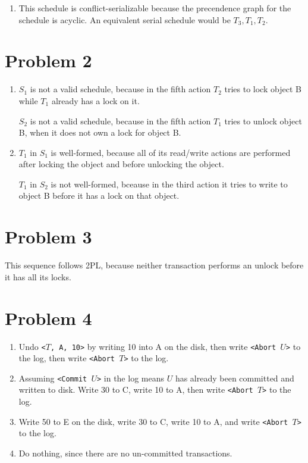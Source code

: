\documentclass[a4paper, 12pt]{article}
\begin{document}
\begin{enumerate}[label=\textbf{S\arabic*:}]
\begin{enumerate}[label=Q\arabic*:]
			\item This schedule is conflict-serializable because the precendence
				graph for the schedule is acyclic. An equivalent serial schedule
				would be $T_3, T_1, T_2$.
		\end{enumerate}
\end{enumerate}

\section*{Problem 2}

\begin{enumerate}[label=Q\arabic*:]
	\item $S_1$ is not a valid schedule, because in the fifth action $T_2$ tries
		to lock object B while $T_1$ already has a lock on it.

		$S_2$ is not a valid schedule, because in the fifth action $T_1$ tries
		to unlock object B, when it does not own a lock for object B.
	\item $T_1$ in $S_1$ is well-formed, because all of its read/write actions
		are performed after locking the object and before unlocking the object.

		$T_1$ in $S_2$ is not well-formed, bceause in the third action it tries
		to write to object B before it has a lock on that object.
\end{enumerate}

\section*{Problem 3}

This sequence follows 2PL, because neither transaction performs an unlock before
it has all its locks.

\section*{Problem 4}

\begin{enumerate}[label=(\alph*)]
	\item Undo \texttt{<$T$, A, 10>} by writing 10 into A on the disk, then
		write \texttt{<Abort $U$>} to the log, then write \texttt{<Abort $T$>}
		to the log.
	\item Assuming \texttt{<Commit $U$>} in the log means $U$ has already been
		committed and written to disk. Write 30 to C, write 10 to A, then write
		\texttt{<Abort $T$>} to the log. 
	\item Write 50 to E on the disk, write 30 to C, write 10 to A, and write
		\texttt{<Abort $T$>} to the log.
	\item Do nothing, since there are no un-committed transactions.

\end{enumerate}
\end{document}
